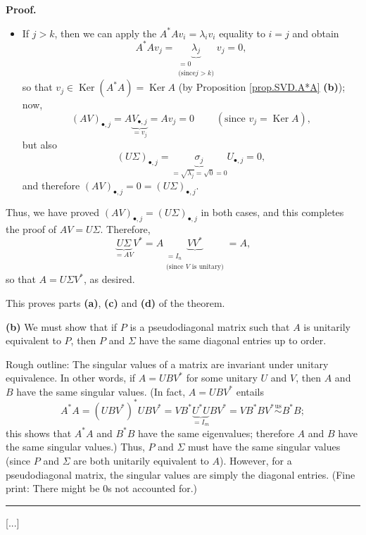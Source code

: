 \documentclass[numbers=enddot,12pt,final,onecolumn,notitlepage]{scrartcl}%
\numberwithin{exer}{subsection}
\theoremstyle{definition}
\newenvironment{proof}[1][Proof]{\noindent\textbf{#1.} }{\ \rule{0.5em}{0.5em}}
\begin{document}
\begin{proof}
\begin{itemize}
\item If $j>k$, then we can apply the $A^{\ast}Av_{i}=\lambda_{i}v_{i}$
equality to $i=j$ and obtain%
\[
A^{\ast}Av_{j}=\underbrace{\lambda_{j}}_{\substack{=0\\\text{(since
}j>k\text{)}}}v_{j}=0,
\]
so that $v_{j}\in\operatorname*{Ker}\left(  A^{\ast}A\right)
=\operatorname*{Ker}A$ (by Proposition \ref{prop.SVD.A*A} \textbf{(b)}); now,%
\[
\left(  AV\right)  _{\bullet,j}=A\underbrace{V_{\bullet,j}}_{=v_{j}}%
=Av_{j}=0\ \ \ \ \ \ \ \ \ \ \left(  \text{since }v_{j}=\operatorname*{Ker}%
A\right)  ,
\]
but also%
\[
\left(  U\Sigma\right)  _{\bullet,j}=\underbrace{\sigma_{j}}_{=\sqrt
{\lambda_{j}}=\sqrt{0}=0}U_{\bullet,j}=0,
\]
and therefore $\left(  AV\right)  _{\bullet,j}=0=\left(  U\Sigma\right)
_{\bullet,j}$.
\end{itemize}

Thus, we have proved $\left(  AV\right)  _{\bullet,j}=\left(  U\Sigma\right)
_{\bullet,j}$ in both cases, and this completes the proof of $AV=U\Sigma$.
Therefore,%
\[
\underbrace{U\Sigma}_{=AV}V^{\ast}=A\underbrace{VV^{\ast}}_{\substack{=I_{n}%
\\\text{(since }V\text{ is unitary)}}}=A,
\]
so that $A=U\Sigma V^{\ast}$, as desired.

This proves parts \textbf{(a)}, \textbf{(c)} and \textbf{(d)} of the theorem.

\textbf{(b)} We must show that if $P$ is a pseudodiagonal matrix such that $A$
is unitarily equivalent to $P$, then $P$ and $\Sigma$ have the same diagonal
entries up to order.

Rough outline: The singular values of a matrix are invariant under unitary
equivalence. In other words, if $A=UBV^{\ast}$ for some unitary $U$ and $V$,
then $A$ and $B$ have the same singular values. (In fact, $A=UBV^{\ast}$
entails%
\[
A^{\ast}A=\left(  UBV^{\ast}\right)  ^{\ast}UBV^{\ast}=VB^{\ast}%
\underbrace{U^{\ast}U}_{=I_{m}}BV^{\ast}=VB^{\ast}BV^{\ast}%
\overset{\operatorname*{us}}{\sim}B^{\ast}B;
\]
this shows that $A^{\ast}A$ and $B^{\ast}B$ have the same eigenvalues;
therefore $A$ and $B$ have the same singular values.) Thus, $P$ and $\Sigma$
must have the same singular values (since $P$ and $\Sigma$ are both unitarily
equivalent to $A$). However, for a pseudodiagonal matrix, the singular values
are simply the diagonal entries. (Fine print: There might be $0$s not
accounted for.)
\end{proof}

[...]

\newpage
\end{document}
